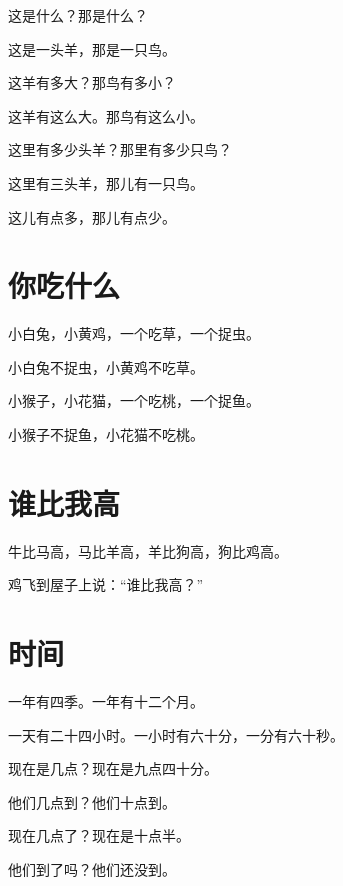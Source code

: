 \documentclass[12pt,UTF-8,openany]{ctexbook}
\begin{document}
\begin{large}
    
    这是什么？那是什么？
    
    这是一头羊，那是一只鸟。
    
    这羊有多大？那鸟有多小？
    
    这羊有这么大。那鸟有这么小。
    
    这里有多少头羊？那里有多少只鸟？
    
    这里有三头羊，那儿有一只鸟。
    
    这儿有点多，那儿有点少。
    
\end{large}





\chapter{你吃什么}

\begin{large}
    
    小白兔，小黄鸡，一个吃草，一个捉虫。
    
    小白兔不捉虫，小黄鸡不吃草。
    
    小猴子，小花猫，一个吃桃，一个捉鱼。
    
    小猴子不捉鱼，小花猫不吃桃。
    
\end{large}





\chapter{谁比我高}

\begin{large}
    
    牛比马高，马比羊高，羊比狗高，狗比鸡高。
    
    鸡飞到屋子上说：“谁比我高？”
    
\end{large}





\chapter{时间}

\begin{large}
    
    一年有四季。一年有十二个月。
    
    一天有二十四小时。一小时有六十分，一分有六十秒。
    
    现在是几点？现在是九点四十分。
    
    他们几点到？他们十点到。
    
    现在几点了？现在是十点半。
    
    他们到了吗？他们还没到。
    
\end{large}
\end{document}
